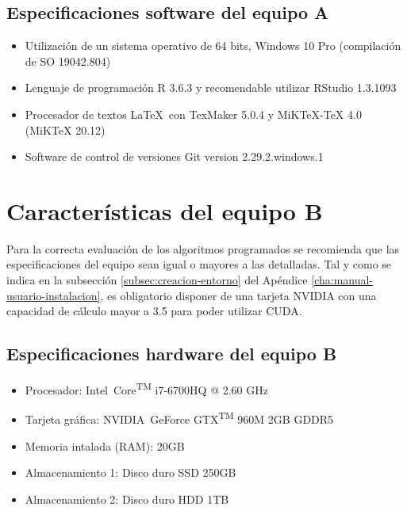 \subsection{Especificaciones software del equipo A}
\label{subsec:especificaciones-software-equipoa}
\begin{itemize}
    \item Utilización de un sistema operativo de 64 bits, Windows 10 Pro (compilación de SO 19042.804)
    \item Lenguaje de programación R 3.6.3 y recomendable utilizar RStudio 1.3.1093
    \item Procesador de textos \LaTeX\ con TexMaker 5.0.4 y MiKTeX-TeX 4.0 (MiKTeX 20.12)
    \item Software de control de versiones Git version 2.29.2.windows.1
\end{itemize}

\section{Características del equipo B}
\label{sec:caracteristicas-segun-equipob}

Para la correcta evaluación de los algoritmos programados se recomienda que las especificaciones del equipo sean igual o mayores a las detalladas. Tal y como se indica en la subsección \ref{subsec:creacion-entorno} del Apéndice \ref{cha:manual-usuario-instalacion}, es obligatorio disponer de una tarjeta NVIDIA con una capacidad de cálculo mayor a 3.5 para poder utilizar CUDA.

\subsection{Especificaciones hardware del equipo B}
\label{subsec:especificaciones-hardware-equipob}

\begin{itemize}
    \item Procesador: Intel\textregistered\ Core\textsuperscript{TM} i7-6700HQ @ 2.60 GHz
    \item Tarjeta gráfica: NVIDIA\textregistered\ GeForce GTX\textsuperscript{TM} 960M 2GB GDDR5
    \item Memoria intalada (RAM): 20GB
    \item Almacenamiento 1: Disco duro SSD 250GB
    \item Almacenamiento 2: Disco duro HDD 1TB
\end{itemize}

